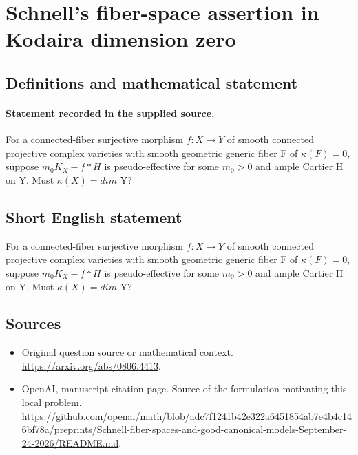 \documentclass[11pt]{article}
\begin{document}
\section*{Schnell’s fiber-space assertion in Kodaira dimension zero}\label{30007060}
\subsection{Definitions and mathematical statement}
\paragraph{Statement recorded in the supplied source.}
For a connected-fiber surjective morphism $f:X\to Y$ of smooth connected projective complex varieties with smooth geometric generic fiber F of $\kappa (F)=0$, suppose $m_{0}K_X-f*H$ is pseudo-effective for some $m_{0}>0$ and ample Cartier H on Y. Must $\kappa (X)=dim$ Y?
\subsection{Short English statement}
For a connected-fiber surjective morphism $f:X\to Y$ of smooth connected projective complex varieties with smooth geometric generic fiber F of $\kappa (F)=0$, suppose $m_{0}K_X-f*H$ is pseudo-effective for some $m_{0}>0$ and ample Cartier H on Y. Must $\kappa (X)=dim$ Y?
\subsection{Sources}
\begin{itemize}
\item[S1] Original question source or mathematical context.
\url{https://arxiv.org/abs/0806.4413}.
\item[S2] OpenAI, manuscript citation page. Source of the formulation motivating this local problem.
\url{https://github.com/openai/math/blob/adc7f1241b42e322a6451854ab7e4b4c146bf78a/preprints/Schnell-fiber-spaces-and-good-canonical-models-September-24-2026/README.md}.
\end{itemize}
\end{document}
